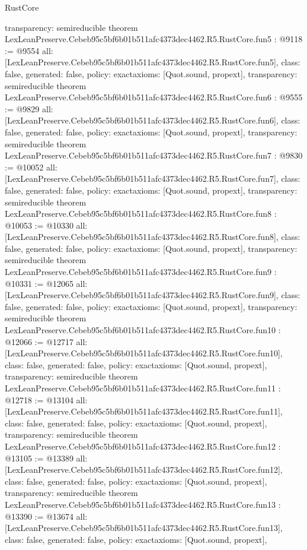 \begin{lexlean}{RustCore}
\begin{coremodule}
{  transparency: semireducible
}
theorem LexLeanPreserve.Cebeb95c5bf6b01b511afc4373dec4462.R5.RustCore.fun5 : @9118 := @9554 {
  all: [LexLeanPreserve.Cebeb95c5bf6b01b511afc4373dec4462.R5.RustCore.fun5],
  class: false,
  generated: false,
  policy: exact{axioms: [Quot.sound, propext]},
  transparency: semireducible
}
theorem LexLeanPreserve.Cebeb95c5bf6b01b511afc4373dec4462.R5.RustCore.fun6 : @9555 := @9829 {
  all: [LexLeanPreserve.Cebeb95c5bf6b01b511afc4373dec4462.R5.RustCore.fun6],
  class: false,
  generated: false,
  policy: exact{axioms: [Quot.sound, propext]},
  transparency: semireducible
}
theorem LexLeanPreserve.Cebeb95c5bf6b01b511afc4373dec4462.R5.RustCore.fun7 : @9830 := @10052 {
  all: [LexLeanPreserve.Cebeb95c5bf6b01b511afc4373dec4462.R5.RustCore.fun7],
  class: false,
  generated: false,
  policy: exact{axioms: [Quot.sound, propext]},
  transparency: semireducible
}
theorem LexLeanPreserve.Cebeb95c5bf6b01b511afc4373dec4462.R5.RustCore.fun8 : @10053 := @10330 {
  all: [LexLeanPreserve.Cebeb95c5bf6b01b511afc4373dec4462.R5.RustCore.fun8],
  class: false,
  generated: false,
  policy: exact{axioms: [Quot.sound, propext]},
  transparency: semireducible
}
theorem LexLeanPreserve.Cebeb95c5bf6b01b511afc4373dec4462.R5.RustCore.fun9 : @10331 := @12065 {
  all: [LexLeanPreserve.Cebeb95c5bf6b01b511afc4373dec4462.R5.RustCore.fun9],
  class: false,
  generated: false,
  policy: exact{axioms: [Quot.sound, propext]},
  transparency: semireducible
}
theorem LexLeanPreserve.Cebeb95c5bf6b01b511afc4373dec4462.R5.RustCore.fun10 : @12066 := @12717 {
  all: [LexLeanPreserve.Cebeb95c5bf6b01b511afc4373dec4462.R5.RustCore.fun10],
  class: false,
  generated: false,
  policy: exact{axioms: [Quot.sound, propext]},
  transparency: semireducible
}
theorem LexLeanPreserve.Cebeb95c5bf6b01b511afc4373dec4462.R5.RustCore.fun11 : @12718 := @13104 {
  all: [LexLeanPreserve.Cebeb95c5bf6b01b511afc4373dec4462.R5.RustCore.fun11],
  class: false,
  generated: false,
  policy: exact{axioms: [Quot.sound, propext]},
  transparency: semireducible
}
theorem LexLeanPreserve.Cebeb95c5bf6b01b511afc4373dec4462.R5.RustCore.fun12 : @13105 := @13389 {
  all: [LexLeanPreserve.Cebeb95c5bf6b01b511afc4373dec4462.R5.RustCore.fun12],
  class: false,
  generated: false,
  policy: exact{axioms: [Quot.sound, propext]},
  transparency: semireducible
}
theorem LexLeanPreserve.Cebeb95c5bf6b01b511afc4373dec4462.R5.RustCore.fun13 : @13390 := @13674 {
  all: [LexLeanPreserve.Cebeb95c5bf6b01b511afc4373dec4462.R5.RustCore.fun13],
  class: false,
  generated: false,
  policy: exact{axioms: [Quot.sound, propext]},
}
\end{coremodule}
\end{lexlean}
